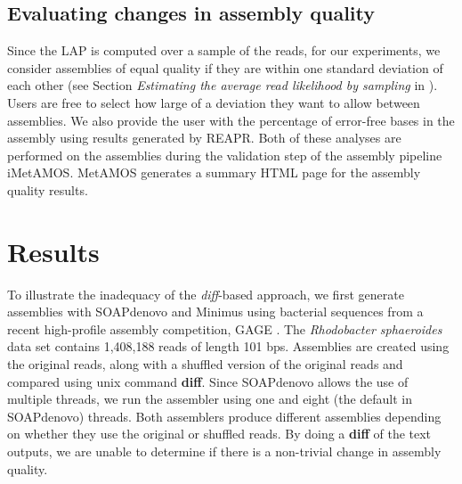 



\subsection{Evaluating changes in assembly quality}
Since the LAP is computed over a sample of the reads, for our experiments, we consider assemblies of equal quality if they are within one standard deviation of each other (see Section \emph{Estimating the average read likelihood by sampling} in \cite{LAP}).
Users are free to select how large of a deviation they want to allow between assemblies.
We also provide the user with the percentage of error-free bases in the assembly using results generated by REAPR.
Both of these analyses are performed on the assemblies during the validation step of the assembly pipeline iMetAMOS\cite{koren2014automated, treangen2011metamos}.
MetAMOS generates a summary HTML page for the assembly quality results.

\section{Results}
\label{results}



To illustrate the inadequacy of the \emph{diff}-based approach, %
we first generate assemblies with SOAPdenovo and Minimus using bacterial sequences from a recent high-profile assembly competition, GAGE \cite{salzberg2012gage}.
The \emph{Rhodobacter sphaeroides} data set contains 1,408,188 reads of length 101 bps.
Assemblies are created using the original reads, along with a shuffled version of the original reads and compared using unix command \textbf{diff}.
Since SOAPdenovo allows the use of multiple threads, we run the assembler using one and eight (the default in SOAPdenovo) threads.
Both assemblers produce different assemblies depending on whether they use the original or shuffled reads.
By doing a \textbf{diff} of the text outputs, we are unable to determine if there is a non-trivial change in assembly quality.

